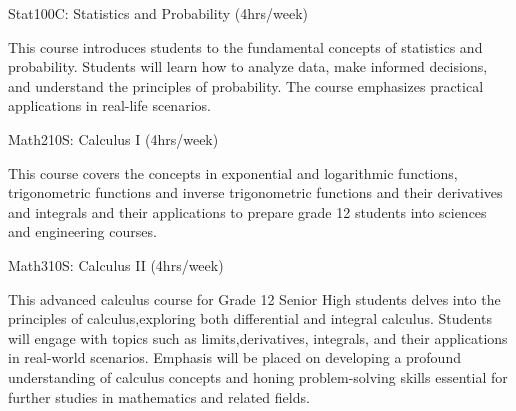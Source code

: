 \begin{subject} Stat100C: Statistics and Probability
	\hfill
	(4hrs/week)
\end{subject}
This course introduces students to the fundamental concepts of statistics and probability. Students will learn how to analyze data, make informed decisions, and understand the principles of probability. The course emphasizes practical applications in real-life scenarios.

\begin{subject} Math210S: Calculus I
	\hfill
	(4hrs/week)
\end{subject}
This course covers the concepts in exponential and logarithmic functions, trigonometric functions and inverse trigonometric functions and their derivatives and integrals and their applications to prepare grade 12 students into sciences and engineering courses.

\begin{subject} Math310S: Calculus II
	\hfill
	(4hrs/week)
\end{subject}
This advanced calculus course for Grade 12 Senior High students delves into the principles of calculus,exploring both differential and integral calculus. Students will engage with topics such as limits,derivatives, integrals, and their applications in real-world scenarios. Emphasis will be placed on developing a profound understanding of calculus concepts and honing problem-solving skills essential for further studies in mathematics and related fields.